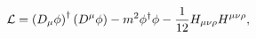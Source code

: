 \begin{equation}\label{4.1}
{\cal L}= \left( D_\mu \phi \right)^\dagger \left( D^\mu \phi
\right) -m^2\phi^\dagger\phi -
\frac{1}{12}H_{\mu\nu\rho}H^{\mu\nu\rho} ,
\end{equation}


